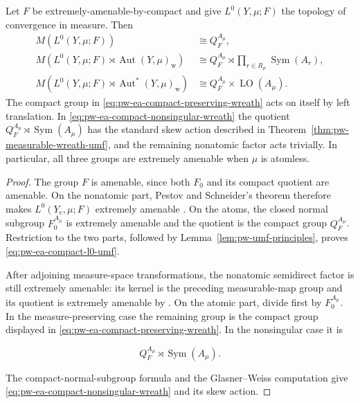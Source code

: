 \begin{theorem}\label{thm:pw-ea-compact-measurable-wreath}
Let \(F\) be extremely-amenable-by-compact and give \(L^0(Y,\mu;F)\)
the topology of convergence in measure. Then
\begin{align}
 M(L^0(Y,\mu;F))
  &\cong Q_F^{A_\mu},
  \label{eq:pw-ea-compact-l0-umf}\\
 M\!\left(L^0(Y,\mu;F)\rtimes\operatorname{Aut}(Y,\mu)_{\mathrm w}\right)
  &\cong Q_F^{A_\mu}\rtimes
        \prod_{r\in R_\mu}\operatorname{Sym}(A_r),
  \label{eq:pw-ea-compact-preserving-wreath}\\
 M\!\left(L^0(Y,\mu;F)\rtimes\operatorname{Aut}^*(Y,\mu)_{\mathrm w}\right)
  &\cong Q_F^{A_\mu}\times\operatorname{LO}(A_\mu).
  \label{eq:pw-ea-compact-nonsingular-wreath}
\end{align}
The compact group in \eqref{eq:pw-ea-compact-preserving-wreath} acts on itself by
left translation.  In \eqref{eq:pw-ea-compact-nonsingular-wreath} the quotient
\(Q_F^{A_\mu}\rtimes\operatorname{Sym}(A_\mu)\) has the standard skew action
described in Theorem~\ref{thm:pw-measurable-wreath-umf}, and the remaining
nonatomic factor acts trivially.  In particular, all three groups are
extremely amenable when \(\mu\) is atomless.
\end{theorem}

\begin{proof}
The group \(F\) is amenable, since both \(F_0\) and its compact quotient are
amenable.  On the nonatomic part, Pestov and Schneider's theorem therefore
makes \(L^0(Y_{\mathrm c},\mu;F)\) extremely amenable
\cite[Theorem~1.1]{PestovSchneider2017}.  On the atoms, the closed normal subgroup
\(F_0^{A_\mu}\) is extremely amenable and the quotient is the compact group
\(Q_F^{A_\mu}\).  Restriction to the two parts, followed by
Lemma~\ref{lem:pw-umf-principles}, proves \eqref{eq:pw-ea-compact-l0-umf}.

After adjoining measure-space transformations, the nonatomic semidirect
factor is still extremely amenable: its kernel is the preceding measurable-map
group and its quotient is extremely amenable by \cite{GiordanoPestov2007}.  On the atomic
part, divide first by \(F_0^{A_\mu}\).  In the measure-preserving case the
remaining group is the compact group displayed in
\eqref{eq:pw-ea-compact-preserving-wreath}.  In the nonsingular case it is

\[
 Q_F^{A_\mu}\rtimes\operatorname{Sym}(A_\mu).
\]

The compact-normal-subgroup formula \cite[Proposition~6.1]{KechrisSokic2012} and the
Glasner--Weiss computation \cite{GlasnerWeiss2002} give
\eqref{eq:pw-ea-compact-nonsingular-wreath} and its skew action.
\end{proof}

